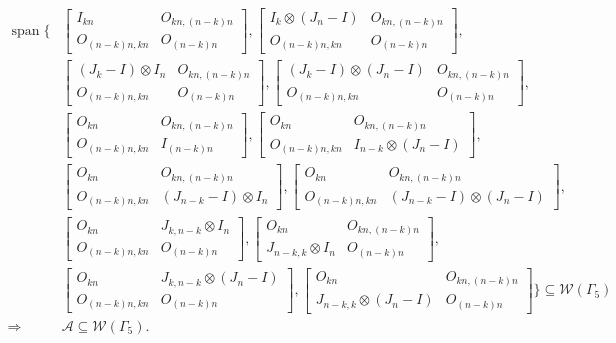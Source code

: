 \begin{align*}
    \operatorname{span}\{
    &\begin{bmatrix}
        I_{kn} & O_{kn, (n-k)n} \\
        O_{(n-k)n,kn} & O_{(n-k)n}
    \end{bmatrix},
    \begin{bmatrix}
        I_k\otimes(J_n-I) & O_{kn, (n-k)n} \\
        O_{(n-k)n,kn} & O_{(n-k)n}
    \end{bmatrix},\\
    &\begin{bmatrix}
        (J_k-I)\otimes I_n & O_{kn, (n-k)n} \\
        O_{(n-k)n,kn} & O_{(n-k)n}
    \end{bmatrix},
    \begin{bmatrix}
        (J_k-I)\otimes (J_n-I) & O_{kn, (n-k)n} \\
        O_{(n-k)n,kn} & O_{(n-k)n}
    \end{bmatrix},\\
    &\begin{bmatrix}
        O_{kn} & O_{kn, (n-k)n} \\
        O_{(n-k)n,kn} & I_{(n-k)n}
    \end{bmatrix},
    \begin{bmatrix}
         O_{kn} & O_{kn, (n-k)n} \\
        O_{(n-k)n,kn} & I_{n-k}\otimes(J_n-I)
    \end{bmatrix},\\
    &\begin{bmatrix}
         O_{kn} & O_{kn, (n-k)n} \\
        O_{(n-k)n,kn} &(J_{n-k}-I) \otimes I_n
    \end{bmatrix},
    \begin{bmatrix}
         O_{kn} & O_{kn, (n-k)n} \\
        O_{(n-k)n,kn} & (J_{n-k}-I)\otimes(J_n-I)
    \end{bmatrix},\\
    &\begin{bmatrix}
        O_{kn} & J_{k,n-k} \otimes I_n \\
        O_{(n-k)n,kn} & O_{(n-k)n}
    \end{bmatrix},
    \begin{bmatrix}
        O_{kn} & O_{kn, (n-k)n} \\
        J_{n-k,k}\otimes I_n & O_{(n-k)n}
    \end{bmatrix},\\
    &\begin{bmatrix}
        O_{kn} & J_{k,n-k} \otimes (J_n-I) \\
        O_{(n-k)n,kn} & O_{(n-k)n}
    \end{bmatrix},
    \begin{bmatrix}
        O_{kn} & O_{kn, (n-k)n} \\
        J_{n-k,k}\otimes (J_n-I) & O_{(n-k)n}
    \end{bmatrix}
    \}\subseteq\mathcal{W}(\Gamma_5)\\
    \Rightarrow &\mathcal{A}\subseteq\mathcal{W}(\Gamma_5).
\end{align*}

